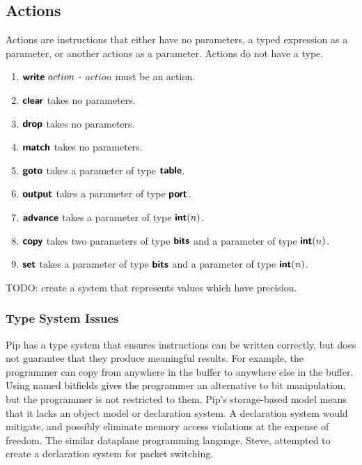 \subsection*{Actions}

Actions are instructions that either have no parameters, a typed expression as a parameter, or another actions as a parameter. Actions do not have a type.
\begin{enumerate}
  \item $\bm{\mathsf{{write}}} \ action$ - $action$ must be an action.
  \item $\bm{\mathsf{{clear}}}$ takes no parameters.
  \item $\bm{\mathsf{{drop}}}$ takes no parameters.
  \item $\bm{\mathsf{{match}}}$ takes no parameters.
  \item $\bm{\mathsf{{goto}}}$ takes a parameter of type $\bm{\mathsf{{table}}}$.
  \item $\bm{\mathsf{{output}}}$ takes a parameter of type $\bm{\mathsf{{port}}}$.
  \item $\bm{\mathsf{{advance}}}$ takes a parameter of type $\bm{\mathsf{{int}}}(n)$.
  \item $\bm{\mathsf{{copy}}}$ takes two parameters of type $\bm{\mathsf{{bits}}}$ and a parameter of type $\bm{\mathsf{{int}}}(n)$.
  \item $\bm{\mathsf{{set}}}$ takes a parameter of type $\bm{\mathsf{{bits}}}$ and a parameter of type $\bm{\mathsf{{int}}}(n)$.
\end{enumerate}

TODO: create a system that represents values which have precision.

\subsubsection{Type System Issues}
Pip has a type system that ensures instructions can be written correctly, but does not guarantee that they produce meaningful results. For example, the programmer can copy from anywhere in the buffer to anywhere else in the buffer. Using named bitfields gives the programmer an alternative to bit manipulation, but the programmer is not restricted to them. Pip's storage-based model means that it lacks an object model or declaration system. A declaration system would mitigate, and possibly eliminate memory access violations at the expense of freedom. The similar dataplane programming language, Steve, attempted to create a declaration system for packet switching.

